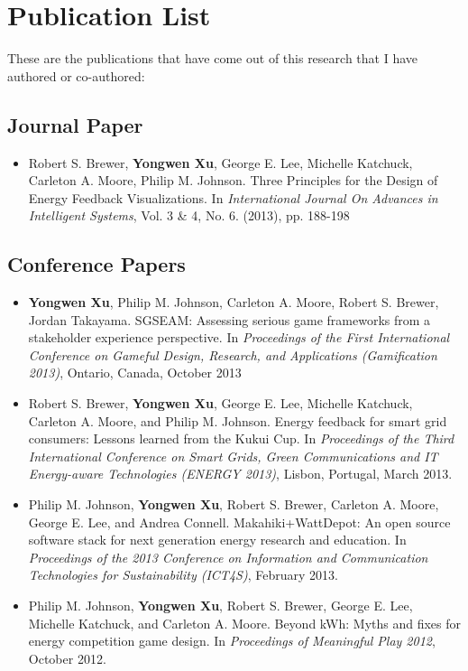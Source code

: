 \chapter{Publication List}
\label{app:publication-list}

These are the publications that have come out of this research that I have authored or co-authored:

\section{Journal Paper}

\begin{itemize}

\item Robert S. Brewer, \textbf{Yongwen Xu}, George E. Lee, Michelle Katchuck, Carleton A. Moore, Philip M. Johnson. Three Principles for the Design of Energy Feedback Visualizations. In   
\emph{International Journal On Advances in Intelligent Systems}, Vol. 3 \& 4, No. 6. (2013), pp. 188-198

\end{itemize}

\section{Conference Papers}

\begin{itemize}
 	
\item \textbf{Yongwen Xu}, Philip M. Johnson, Carleton A. Moore, Robert S. Brewer, Jordan Takayama. SGSEAM: Assessing serious game frameworks from a stakeholder experience perspective.   
In \emph{Proceedings of the First International Conference on Gameful Design, Research, and Applications (Gamification 2013)}, Ontario, Canada, October 2013

\item Robert S. Brewer, \textbf{Yongwen Xu}, George E. Lee, Michelle Katchuck, Carleton A. Moore, and Philip M. Johnson. Energy feedback for smart grid consumers: Lessons learned from the Kukui Cup. In \emph{Proceedings of the Third International Conference on Smart Grids, Green Communications and IT Energy-aware Technologies (ENERGY 2013)}, Lisbon, Portugal, March 2013.

\item Philip M. Johnson, \textbf{Yongwen Xu}, Robert S. Brewer, Carleton A. Moore, George E. Lee, and Andrea Connell. Makahiki+WattDepot: An open source software stack for next generation energy research and education. In \emph{Proceedings of the 2013 Conference on Information and Communication Technologies for Sustainability (ICT4S)}, February 2013.

\item Philip M. Johnson, \textbf{Yongwen Xu}, Robert S. Brewer, George E. Lee, Michelle Katchuck, and Carleton A. Moore. Beyond kWh: Myths and fixes for energy competition game design. In \emph{Proceedings of Meaningful Play 2012}, October 2012.

\end{itemize}


